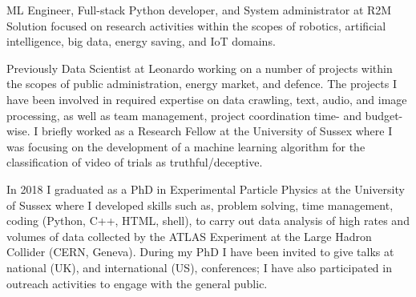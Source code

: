 
ML Engineer, Full-stack Python developer, and System administrator at R2M Solution focused on research activities within the scopes of robotics, artificial intelligence, big data, energy saving, and IoT domains.

Previously Data Scientist at Leonardo working on a number of projects within the scopes of public administration, energy market, and defence. The projects I have been involved in required expertise on data crawling, text, audio, and image processing, as well as team management, project coordination time- and budget-wise. I briefly worked as a Research Fellow at the University of Sussex where I was focusing on the development of a machine learning algorithm for the classification of video of trials as truthful/deceptive. 

In 2018 I graduated as a PhD in Experimental Particle Physics at the University of Sussex where I developed skills such as, problem solving, time management, coding (Python, C++, HTML, shell), to carry out data analysis of high rates and volumes of data collected by the ATLAS Experiment at the Large Hadron Collider (CERN, Geneva). During my PhD I have been invited to give talks at national (UK), and international (US), conferences; I have also participated in outreach activities to engage with the general public.